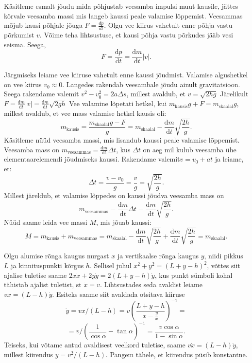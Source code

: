 \documentclass[10pt]{article}
\begin{document}
\solu
Käsitleme esmalt jõudu mida põhjustab veesamba impulsi muut kausile, jättes kõrvale veesamba massi mis langeb kaussi peale valamise lõppemist. Veesammas mõjub kausi põhjale jõuga $F=\frac{dp}{dt}$. Olgu vee kiirus vahetult enne põhja vastu põrkumist $v$. Võime teha lihtsustuse, et kausi põhja vastu põrkudes jääb vesi seisma. Seega,
\[
F=\frac{\mathrm{d}{p}}{\mathrm{d}{t}}=\frac{\mathrm{d}{m}}{\mathrm{d}{t}} |v|.
\]\par 
\noindent Järgmiseks leiame vee kiiruse vahetult enne kaussi jõudmist.  Valamise algushetkel on vee kiirus $v_0\approx 0$. Langedes rakendab veesambale jõudu ainult gravitatsioon. Seega rakendame valemit $v^2-v_0^2=2a\Delta s$, millest avaldub, et $v=\sqrt{2hg}$
Järelikult $F=\frac{\mathrm{d}{m}}{\mathrm{d}{t}} |v|=\frac{\mathrm{d}{m}}{\mathrm{d}{t}}\sqrt{2gh}$
Vee valamine lõpetati hetkel, kui $m_{\mathrm{kausis}} g+F=m_\mathrm{skaalal}g$, millest avaldub, et vee mass valamise hetkel kausis oli:
\begin{equation*}
m_{\mathrm{kausis}}=\frac{m_{\mathrm{skaalal}} g-F}{g}=m_{\mathrm{skaalal}}-\frac{\mathrm{d}{m}}{\mathrm{d}{t}}\sqrt{\frac{2h}{g}}.
\end{equation*}
Käsitleme nüüd veesamba massi, mis lisandub kaussi peale valamise lõppemist. Veesamba mass on $m_{\mathrm{veesammas}}=\frac{\mathrm{d}{m}}{\mathrm{d}{t}}\Delta t$, kus $\Delta t$ on aeg mil kulub veesamba ühe elementaarelemendi jõudmiseks kaussi. Rakendame valemit$v=v_0+at$ ja leiame, et:
\begin{equation*}
\Delta t = \frac{v-v_0}{g}=\frac{v}{g}=\sqrt{\frac{2h}{g}}.
\end{equation*}
Millest järeldub, et valamise lõppedes on kaussi jõudva veesamba mass on
\begin{equation*}
m_{\mathrm{veesammas}}=\frac{\mathrm{d}{m}}{\mathrm{d}{t}} \Delta t = \frac{\mathrm{d}{m}}{\mathrm{d}{t}}\sqrt{\frac{2h}{g}}.
\end{equation*}
Nüüd saame leida vee massi $M$, mis jõuab kaussi:
\begin{equation*}
M=m_{\mathrm{kausis}}+m_{\mathrm{veesammas}}=m_{\mathrm{skaalal}}-\frac{\mathrm{d}{m}}{\mathrm{d}{t}}\sqrt{\frac{2h}{g}}+\frac{\mathrm{d}{m}}{\mathrm{d}{t}}\sqrt{\frac{2h}{g}}=m_{\mathrm{skaalal}}.
\end{equation*}
\probend
\bigskip


\solu
Olgu alumise rõnga kaugus nurgast $x$ ja vertikaalse rõnga kaugus $y$, niidi pikkus $L$ ja kinnituspunkti kõrgus $h$. Sellisel juhul $x^2+y^2=(L+y-h)^2$, võttes siit ajalise tuletise saame $2x\dot x+2y\dot y=2(L+y-h)\dot y$, kus punkt sümboli kohal tähistab ajalist tuletist, st $\dot x=v$. Lihtsustades seda avaldist leiame $vx=(L-h)\dot y$. Esiteks saame siit avaldada otsitava kiiruse
$$
\dot y=vx/(L-h)=v\left(\frac{L+y-h}{x-\frac yx}\right)^{-1}=
$$
$$
=v/(\frac 1{\cos\alpha}-\tan\alpha)^{-1}=\frac{v\cos\alpha}{1-\sin\alpha}.
$$
Teiseks, kui võtame antud avaldisest veelkord tuletise, saame $v\dot x=(L-h)\ddot y$, millest kiirendus $\ddot y=v^2/(L-h)$. Pangem tähele, et kiirendus püsib konstantne.
\probend
\bigskip
\end{document}
